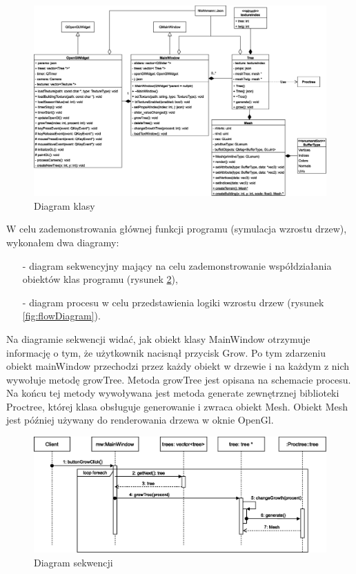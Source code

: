 \documentclass[a4paper,twoside,12pt]{report}
\begin{document}
\begin{figure}[H]
	\centering\includegraphics[width=15.5cm]{grafika/diagrams/class}
	\caption{Diagram klasy}
    \label{fig:classDiagram}
\end{figure}

W celu zademonstrowania głównej funkcji programu 
(symulacja wzrostu drzew), wykonałem dwa diagramy: 
\begin{itemize}
	\item[-] diagram sekwencyjny mający na celu zademonstrowanie współdziałania obiektów klas programu (rysunek \ref{fig:sequenceDiagram}),
	\item[-] diagram procesu w celu przedstawienia logiki wzrostu drzew (rysunek \ref{fig:flowDiagram}).
\end{itemize}

Na diagramie sekwencji widać, jak obiekt klasy 
MainWindow otrzymuje informację o tym, 
że użytkownik nacisnął przycisk Grow. 
Po tym zdarzeniu obiekt mainWindow przechodzi przez 
każdy obiekt w drzewie i na każdym z nich wywołuje 
metodę growTree. Metoda growTree jest opisana na 
schemacie procesu. Na końcu tej metody wywoływana 
jest metoda generate zewnętrznej biblioteki Proctree, 
której klasa obsługuje generowanie i zwraca obiekt Mesh.
Obiekt Mesh jest później używany do renderowania drzewa 
w oknie OpenGl.

\begin{figure}[H]
	\centering\includegraphics[width=15.5cm]{grafika/diagrams/sequence}
	\caption{Diagram sekwencji}
    \label{fig:sequenceDiagram}
\end{figure}
\end{document}
